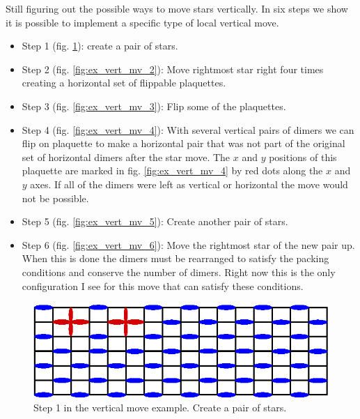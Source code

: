 \documentclass[aps,floatfix,11pt]{revtex4-1}
\begin{document}
Still figuring out the possible ways to move stars vertically. In six steps we show it is possible
to implement a specific type of local vertical move. 
\\

\begin{itemize}
    \item 
    Step 1 (fig. \ref{fig:ex_vert_mv_1}): create a pair of stars.
    
    \item 
    Step 2 (fig. \ref{fig:ex_vert_mv_2}): Move rightmost star right four times creating a horizontal set of
    flippable plaquettes.
    
    \item
    Step 3 (fig. \ref{fig:ex_vert_mv_3}): Flip some of the plaquettes. 
    
    \item
    Step 4 (fig. \ref{fig:ex_vert_mv_4}): With several vertical pairs of dimers we can flip on plaquette to make a
    horizontal pair that was not part of the original set of horizontal dimers after the star move. The
    $x$ and $y$ positions of this plaquette are marked in fig. \ref{fig:ex_vert_mv_4} by red dots along the $x$ and $y$
    axes. If all of the dimers were left as vertical or horizontal the move would not be possible.
    
    \item
    Step 5 (fig. \ref{fig:ex_vert_mv_5}): Create another pair of stars.
    
    \item
    Step 6 (fig. \ref{fig:ex_vert_mv_6}): Move the rightmost star of the new pair up. When this is done
    the dimers must be rearranged to satisfy the packing conditions and conserve the number of dimers.
    Right now this is the only configuration I see for this move that can satisfy these conditions.
\end{itemize}


\begin{figure}[h]
    \centering
    \includegraphics[width=8.5 cm]{ex_vert_mv_1}
    \caption{Step 1 in the vertical move example. Create a pair of stars.\label{fig:ex_vert_mv_1}}
\end{figure}
\end{document}
